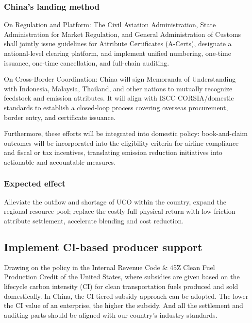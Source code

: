 \documentclass[a4paper,11pt]{article}
\begin{document}
\subsubsection{China's landing method}
On Regulation and Platform: The Civil Aviation Administration, State Administration for Market Regulation, and General Administration of Customs shall jointly issue guidelines for Attribute Certificates (A-Certs), designate a national-level clearing platform, and implement unified numbering, one-time issuance, one-time cancellation, and full-chain auditing.

On Cross-Border Coordination: China will sign Memoranda of Understanding with Indonesia, Malaysia, Thailand, and other nations to mutually recognize feedstock and emission attributes. It will align with ISCC CORSIA/domestic standards to establish a closed-loop process covering overseas procurement, border entry, and certificate issuance.

Furthermore, these efforts will be integrated into domestic policy: book-and-claim outcomes will be incorporated into the eligibility criteria for airline compliance and fiscal or tax incentives, translating emission reduction initiatives into actionable and accountable measures.

\subsubsection{Expected effect}
Alleviate the outflow and shortage of UCO within the country, expand the regional resource pool; replace the costly full physical return with low-friction attribute settlement, accelerate blending and cost reduction.

\subsection{Implement CI-based producer support}
Drawing on the policy in the Internal Revenue Code \& 45Z Clean Fuel Production Credit of the United States, where subsidies are given based on the lifecycle carbon intensity (CI) for clean transportation fuels produced and sold domestically. In China, the CI tiered subsidy approach can be adopted. The lower the CI value of an enterprise, the higher the subsidy. And all the settlement and auditing parts should be aligned with our country's industry standards.
\end{document}
